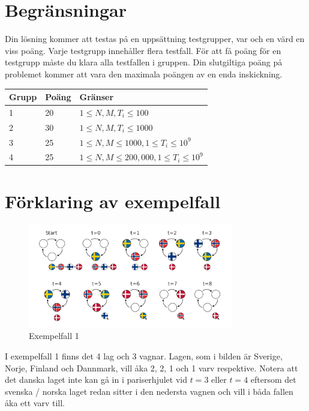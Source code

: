 \section*{Begränsningar}
Din lösning kommer att testas på en uppsättning testgrupper, var och en värd en viss poäng.
Varje testgrupp innehåller flera testfall.
För att få poäng för en testgrupp måste du klara alla testfallen i gruppen.
Din slutgiltiga poäng på problemet kommer att vara den maximala poängen av en enda inskickning.

\noindent
\begin{tabular}{| l | l | l |}
\hline
Grupp & Poäng & Gränser \\ \hline
1     & 20    & $1 \le N, M, T_i \le 100$ \\ \hline
2     & 30    & $1 \le N, M, T_i \le 1000$ \\ \hline
3     & 25    & $1 \le N, M \le 1000, 1 \le T_i \le 10^9$ \\ \hline
4     & 25    & $1 \le N, M \le 200,000, 1 \le T_i \le 10^9$ \\ \hline
\end{tabular}

\section*{Förklaring av exempelfall}

\begin{figure}[h]
	\centering
\includegraphics[width=0.8\textwidth]{sample1}
\caption{Exempelfall 1}
\end{figure}

I exempelfall 1 finns det 4 lag och 3 vagnar.
Lagen, som i bilden är Sverige, Norje, Finland och Dannmark, vill åka 2, 2, 1 och 1 varv respektive.
Notera att det danska laget inte kan gå in i pariserhjulet vid $t=3$ eller $t=4$
eftersom det svenska / norska laget redan sitter i den nedersta vagnen och vill i båda fallen åka ett varv till.
